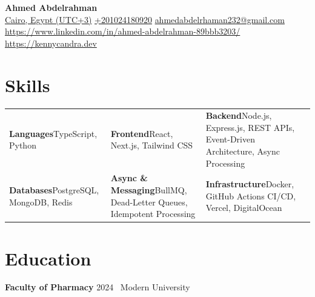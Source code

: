\documentclass[11pt]{article}
\begin{document}
\begin{center}
{\LARGE \textbf{ Ahmed Abdelrahman }} \\[4pt]
\href{Cairo, Egypt (UTC+3)}{Cairo, Egypt (UTC+3)} \textbar{} \href{+201024180920}{+201024180920} \textbar{} \href{ahmedabdelrhaman232@gmail.com}{ahmedabdelrhaman232@gmail.com} \textbar{} \href{https://www.linkedin.com/in/ahmed-abdelrahman-89bbb3203/}{https://www.linkedin.com/in/ahmed-abdelrahman-89bbb3203/} \textbar{} \href{https://kennycandra.dev}{https://kennycandra.dev}
\end{center}

\section{Skills}
\begin{tabularx}{\textwidth}{X X X}
\textbf{Languages}\newline TypeScript, Python & \textbf{Frontend}\newline React, Next.js, Tailwind CSS & \textbf{Backend}\newline Node.js, Express.js, REST APIs, Event-Driven Architecture, Async Processing \\
\textbf{Databases}\newline PostgreSQL, MongoDB, Redis & \textbf{Async \& Messaging}\newline BullMQ, Dead-Letter Queues, Idempotent Processing & \textbf{Infrastructure}\newline Docker, GitHub Actions CI/CD, Vercel, DigitalOcean \\
\end{tabularx}

\section{Education}
\textbf{Faculty of Pharmacy} \hfill 2024 \
Modern University
\end{document}
